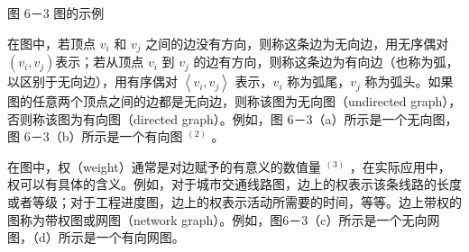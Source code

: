 \documentclass[10pt]{article}
\begin{document}
图 6－3 图的示例

在图中，若顶点 $v_{i}$ 和 $v_{j}$ 之间的边没有方向，则称这条边为无向边，用无序偶对 $\left(v_{i}, v_{j}\right)$表示；若从顶点 $v_{i}$ 到 $v_{j}$ 的边有方向，则称这条边为有向边（也称为弧，以区别于无向边），用有序偶对 $\left\langle v_{i}, v_{j}\right\rangle$ 表示，$v_{i}$ 称为弧尾，$v_{j}$ 称为弧头。如果图的任意两个顶点之间的边都是无向边，则称该图为无向图（undirected graph），否则称该图为有向图（directed graph）。例如，图 6－3（a）所示是一个无向图，图 6－3（b）所示是一个有向图 ${ }^{(2)}$ 。

在图中，权（weight）通常是对边赋予的有意义的数值量 ${ }^{(3)}$ ，在实际应用中，权可以有具体的含义。例如，对于城市交通线路图，边上的权表示该条线路的长度或者等级；对于工程进度图，边上的权表示活动所需要的时间，等等。边上带权的图称为带权图或网图（network graph）。例如，图6－3（c）所示是一个无向网图，（d）所示是一个有向网图。
\end{document}
